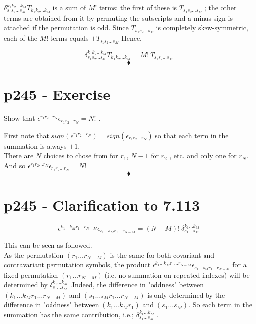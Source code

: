 $\delta^{k_1k_2\dots k_M}_{s_1s_2\dots s_M}T_{k_1k_2\dots k_M}$ is a sum of $M!$ terms: the first of these is $T_{s_1s_2\dots s_M}$ ; the other terms are obtained from it by permuting the subscripts and a minus sign is attached if the permutation is odd. Since $T_{s_1s_2\dots s_M}$ is completely skew-symmetric, each of the $M!$ terms equals  $+T_{s_1s_2\dots s_M}$ 
Hence,

$$ \delta^{k_1k_2\dots k_M}_{s_1s_2\dots s_M}T_{k_1k_2\dots k_M}= M! \ T_{s_1s_2\dots s_M}$$
$$\blacklozenge$$
\newpage



\section{p245 - Exercise}
\begin{tcolorbox}
Show that $\epsilon^{r_1r_2\dots r_N}\epsilon_{r_1r_2\dots r_N}= N!$ .
\end{tcolorbox}
First note that $sign(\epsilon^{r_1r_2\dots r_N})=sign(\epsilon_{r_1r_2\dots r_N})$ so that each term in the summation is always $+1$.\\
There are $N$ choices to chose from for $r_1$, $N-1$ for $r_2$ , etc. and only one for $r_N$. And so $\epsilon^{r_1r_2\dots r_N}\epsilon_{r_1r_2\dots r_N}= N!$ 
$$\blacklozenge$$
\newpage




\section{p245 - Clarification to 7.113 }
\begin{tcolorbox}
$$\epsilon^{k_1\dots k_M r_1\dots r_{N-M}}\epsilon_{s_1\dots s_M r_1\dots r_{N-M}}= \left(N-M\right)!\ \delta^{k_1\dots k_M}_{s_1\dots s_M}$$
\end{tcolorbox}
This can be seen as followed.\\
As the permutation $\left(r_1\dots r_{N-M}\right) $ is the same for both covariant and contravariant permutation symbols, the product $\epsilon^{k_1\dots k_M r_1\dots r_{N-M}}\epsilon_{s_1\dots s_M r_1\dots r_{N-M}}$ for a fixed permutation $\left(r_1\dots r_{N-M}\right) $ (i.e. no summation on repeated indexes) will be determined by $\delta^{k_1\dots k_M}_{s_1\dots s_M} $ .Indeed,  the difference in "oddness" between  $(k_1\dots k_M r_1\dots r_{N-M})$ and $(s_1\dots s_M r_1\dots r_{N-M})$  is only determined by the difference in "oddness" between  $(k_1\dots k_M r_1)$ and $(s_1\dots s_M )$. So each term in the summation has the same contribution, i.e.; $\delta^{k_1\dots k_M}_{s_1\dots s_M} $ .

